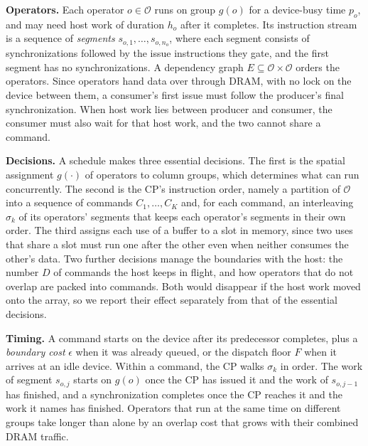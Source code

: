 \textbf{Operators.}
Each operator $o \in \mathcal{O}$ runs on group $g(o)$ for a device-busy time $p_o$, and may need host work of duration $h_o$ after it completes.
Its instruction stream is a sequence of \emph{segments} $s_{o,1}, \dots, s_{o,n_o}$, where each segment consists of synchronizations followed by the issue instructions they gate, and the first segment has no synchronizations.
A dependency graph $E \subseteq \mathcal{O} \times \mathcal{O}$ orders the operators.
Since operators hand data over through DRAM, with no lock on the device between them, a consumer's first issue must follow the producer's final synchronization.
When host work lies between producer and consumer, the consumer must also wait for that host work, and the two cannot share a command.

\textbf{Decisions.}
A schedule makes three essential decisions.
The first is the spatial assignment $g(\cdot)$ of operators to column groups, which determines what can run concurrently.
The second is the CP's instruction order, namely a partition of $\mathcal{O}$ into a sequence of commands $C_1, \dots, C_K$ and, for each command, an interleaving $\sigma_k$ of its operators' segments that keeps each operator's segments in their own order.
The third assigns each use of a buffer to a slot in memory, since two uses that share a slot must run one after the other even when neither consumes the other's data.
Two further decisions manage the boundaries with the host: the number $D$ of commands the host keeps in flight, and how operators that do not overlap are packed into commands.
Both would disappear if the host work moved onto the array, so we report their effect separately from that of the essential decisions.

\textbf{Timing.}
A command starts on the device after its predecessor completes, plus a \emph{boundary cost} $\epsilon$ when it was already queued, or the dispatch floor $F$ when it arrives at an idle device.
Within a command, the CP walks $\sigma_k$ in order.
The work of segment $s_{o,j}$ starts on $g(o)$ once the CP has issued it and the work of $s_{o,j-1}$ has finished, and a synchronization completes once the CP reaches it and the work it names has finished.
Operators that run at the same time on different groups take longer than alone by an overlap cost that grows with their combined DRAM traffic.

